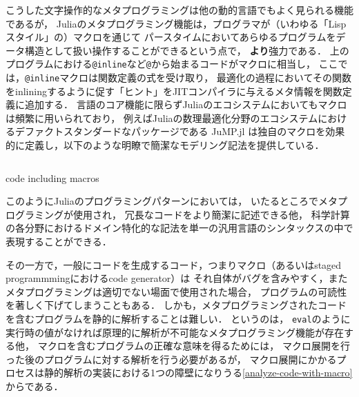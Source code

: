 \inputminted[frame=lines, firstline=3, lastline=12, breaklines]{julia}{src/sums_def.jl}

こうした文字操作的なメタプログラミングは他の動的言語でもよく見られる機能であるが，
Juliaのメタプログラミング機能は，プログラマが（いわゆる「Lispスタイル」の）マクロを通じて
パースタイムにおいてあらゆるプログラムをデータ構造として扱い操作することができるという点で，
\textbf{より}強力である．
上のプログラムにおける\verb|@inline|など\verb|@|から始まるコードがマクロに相当し，
ここでは，\verb|@inline|マクロは関数定義の式を受け取り，
最適化の過程においてその関数をinliningするように促す「ヒント」をJITコンパイラに与えるメタ情報を関数定義に追加する．
言語のコア機能に限らずJuliaのエコシステムにおいてもマクロは頻繁に用いられており，
例えばJuliaの数理最適化分野のエコシステムにおけるデファクトスタンダードなパッケージである
JuMP.jl\cite{DunningHuchetteLubin2017}
は独自のマクロを効果的に定義し，以下のような明瞭で簡潔なモデリング記法を提供している．

\begin{listing}[ht]
  \inputminted[frame=lines, linenos, firstnumber=1, firstline=4, lastline=10]{julia}{src/jump.jl}
  \caption{code including macros}
  \label{lst:target2}
\end{listing}

このようにJuliaのプログラミングパターンにおいては，
いたるところでメタプログラミングが使用され\footnotemark，
冗長なコードをより簡潔に記述できる他，
科学計算の各分野におけるドメイン特化的な記法を単一の汎用言語のシンタックスの中で表現することができる\cite{jeff-phd}．


その一方で，一般にコードを生成するコード，つまりマクロ（あるいはstaged programmmingにおけるcode generator）は
それ自体がバグを含みやすく，またメタプログラミングは適切でない場面で使用された場合，
プログラムの可読性を著しく下げてしまうこともある．
しかも，メタプログラミングされたコードを含むプログラムを静的に解析することは難しい．
というのは，
\verb|eval|のように実行時の値がなければ原理的に解析が不可能なメタプログラミング機能が存在する他，
マクロを含むプログラムの正確な意味を得るためには，
マクロ展開を行った後のプログラムに対する解析を行う必要があるが，
マクロ展開にかかるプロセスは静的解析の実装における1つの障壁になりうる\ref{analyze-code-with-macro}
からである．

